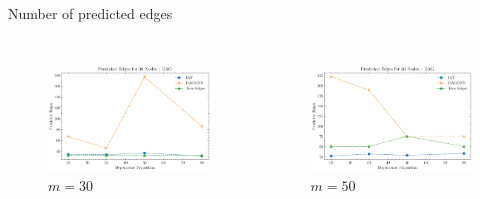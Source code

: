 \documentclass{beamer}
\begin{document}
\begin{frame}{Number of predicted edges}
\begin{columns}
\begin{column}{0.5\textwidth}
\begin{figure}
            \end{figure}
        \end{column}
    \end{columns}
    \begin{columns}
        \begin{column}{0.5\textwidth}
        \begin{figure}
            \centering
            \includegraphics[scale=0.3]{fig/Predicted Edges_dependence_30_DAG_threshold0.3.pdf}
            \caption{$m=30$}
            \label{fig:dep_gaussian_edges_30}
        \end{figure}
        \end{column}
        \begin{column}{0.5\textwidth}
        \begin{figure}
            \centering
            \includegraphics[scale=0.3]{fig/Predicted Edges_dependence_50_DAG_threshold0.3.pdf}
            \caption{$m=50$}
            \label{fig:dep_gaussian_edges_50}
        \end{figure}
        \end{column}
    \end{columns}    
\end{frame}
\end{document}
